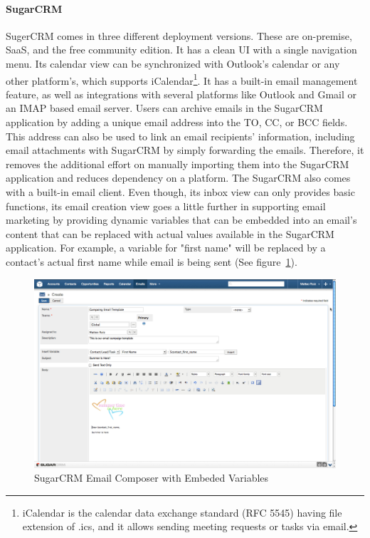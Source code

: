 \paragraph{SugarCRM}
SugerCRM comes in three different deployment versions. These are on-premise, \ac{SaaS}, and the free community edition. It has a clean \ac{UI} with a single navigation menu. Its calendar view can be synchronized with Outlook's calendar or any other platform's, which supports iCalendar\footnote{iCalendar is the calendar data exchange standard (RFC 5545) having file extension of .ics, and it allows sending meeting requests or tasks via email.}. It has a built-in email management feature, as well as integrations with several platforms like Outlook and Gmail or an \ac{IMAP} based email server. Users can archive emails in the SugarCRM application by adding a unique email address into the TO, \ac{CC}, or \ac{BCC} fields. This address can also be used to link an email recipients' information, including email attachments with SugarCRM by simply forwarding the emails. Therefore, it removes the additional effort on manually importing them into the SugarCRM application and reduces dependency on a platform. The SugarCRM also comes with a built-in email client. Even though, its inbox view can only provides basic functions, its email creation view goes a little further in supporting email marketing by providing dynamic variables that can be embedded into an email's content that can be replaced with actual values available in the SugarCRM application. For example, a variable for "first name" will be replaced by a contact's actual first name while email is being sent (See figure~\ref{fig:SugarCRM-Create_Email}). 
\vspace{1cm}

\begin{figure}[htbp]
	\centering
	\includegraphics[width=1.00\textwidth]{imgs/SugarCRM-Create_Email.png}
	\caption[SugarCRM Email Composer with Embeded Variables]{SugarCRM Email Composer with Embeded Variables \citep{SugarCRMInc.2013}}
	\label{fig:SugarCRM-Create_Email}
\end{figure}

